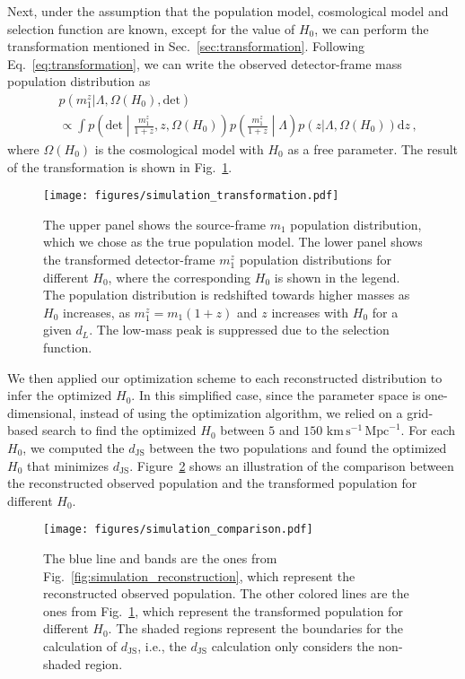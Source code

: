\documentclass[sn-aps, pdflatex]{sn-jnl}
\begin{document}
Next, under the assumption that the population model, cosmological model and selection function are known, except for the value of $H_0$, we can perform the transformation mentioned in Sec.~\ref{sec:transformation}.
Following Eq.~\eqref{eq:transformation}, we can write the observed detector-frame mass population distribution as
\begin{equation}
    \begin{aligned}
        &p(m^z_1|\Lambda, \Omega(H_0), \mathrm{det}) \\
        &\propto \int p\left(\mathrm{det}\middle|\frac{m^z_1}{1+z},z,\Omega(H_0)\right)p\left(\frac{m^z_1}{1+z}\middle|\Lambda\right)p(z|\Lambda, \Omega(H_0)) \mathrm{d}z\,,
    \end{aligned}
    \label{eq:transformation_H0}
\end{equation}
where $\Omega(H_0)$ is the cosmological model with $H_0$ as a free parameter.
The result of the transformation is shown in Fig.~\ref{fig:simulation_transformation}.
\begin{figure}[htbp]
    \texttt{[image: figures/simulation\_transformation.pdf]}
    \caption{
        The upper panel shows the source-frame $m_1$ population distribution, which we chose as the true population model.
        The lower panel shows the transformed detector-frame $m^z_1$ population distributions for different $H_0$, where the corresponding $H_0$ is shown in the legend.
        The population distribution is redshifted towards higher masses as $H_0$ increases, as $m^z_1 = m_1(1+z)$ and $z$ increases with $H_0$ for a given $d_L$.
        The low-mass peak is suppressed due to the selection function.
    }
    \label{fig:simulation_transformation}
\end{figure}

We then applied our optimization scheme to each reconstructed distribution to infer the optimized $H_0$.
In this simplified case, since the parameter space is one-dimensional, instead of using the optimization algorithm, we relied on a grid-based search to find the optimized $H_0$ between $5$ and $150$ $\mathrm{km}\,\mathrm{s}^{-1}\,\mathrm{Mpc}^{-1}$.
For each $H_0$, we computed the $d_\mathrm{JS}$ between the two populations and found the optimized $H_0$ that minimizes $d_\mathrm{JS}$.
Figure~\ref{fig:simulation_comparison} shows an illustration of the comparison between the reconstructed observed population and the transformed population for different $H_0$.
\begin{figure}[htbp]
    \texttt{[image: figures/simulation\_comparison.pdf]}
    \caption{
        The blue line and bands are the ones from Fig.~\ref{fig:simulation_reconstruction}, which represent the reconstructed observed population.
        The other colored lines are the ones from Fig.~\ref{fig:simulation_transformation}, which represent the transformed population for different $H_0$.
        The shaded regions represent the boundaries for the calculation of $d_\mathrm{JS}$, i.e., the $d_\mathrm{JS}$ calculation only considers the non-shaded region.
    }
    \label{fig:simulation_comparison}
\end{figure}
\end{document}
